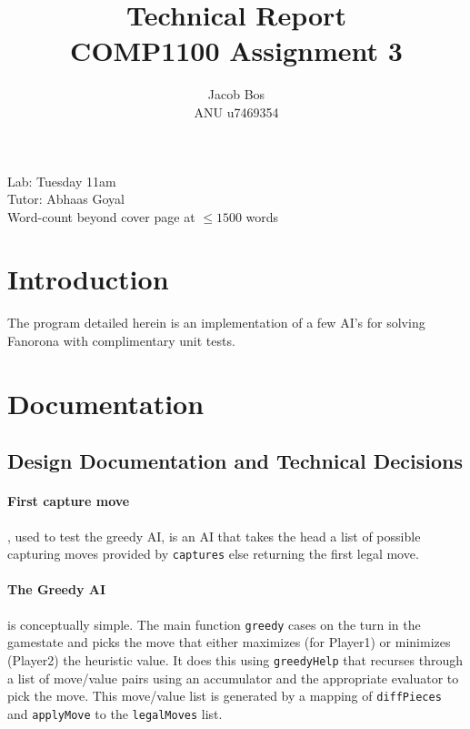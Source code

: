 \documentclass[11pt]{article}
\title{Technical Report\\ COMP1100 Assignment 3}
\author{Jacob Bos\\ ANU u7469354}
\begin{document}
\maketitle
{}
\begin{center}
  Lab: Tuesday 11am\\
  Tutor: Abhaas Goyal\\
  Word-count beyond cover page at $\leq 1500$ words
\end{center}
\tableofcontents
\newpage
{}
\section{Introduction} 
The program detailed herein is an implementation of a few AI's for solving Fanorona with complimentary unit tests.


\section{Documentation}%
\subsection*{Design Documentation and Technical Decisions}
\paragraph*{First capture move}, used to test the greedy AI, is an AI that takes the head a list of possible capturing moves provided by \verb|captures| else returning the first legal move.

\paragraph{The Greedy AI} is conceptually simple. The main function \verb|greedy| cases on the turn in the gamestate and picks the move that either maximizes (for Player1) or minimizes (Player2) the heuristic value. It does this using \verb|greedyHelp| that recurses through a list of move/value pairs using an accumulator and the appropriate evaluator to pick the move. This move/value list is generated by a mapping of \verb|diffPieces| and \verb|applyMove| to the \verb|legalMoves| list.
\end{document}
